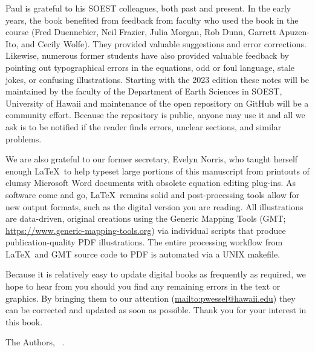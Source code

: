 Paul is grateful to his SOEST colleagues, both past and present. In the early years, the book benefited from
feedback from faculty who used the book in the course (Fred Duennebier, Neil Frazier, Julia Morgan, Rob Dunn, Garrett Apuzen-Ito, and Cecily Wolfe).  They provided valuable suggestions and error corrections.  Likewise, numerous former students have
also provided valuable feedback by pointing out typographical errors in the equations, odd or foul language,
stale jokes, or confusing illustrations.  Starting with the 2023 edition these notes will be maintained by the
faculty of the Department of Earth Sciences in SOEST, University of Hawaii and maintenance of the open
repository on GitHub will be a community effort.  Because the repository is public, anyone may use it and
all we ask is to be notified if the reader finds errors, unclear sections, and similar problems.

We are also grateful to our former secretary, Evelyn Norris,
who taught herself enough \LaTeX\ to help typeset large portions of this manuscript from printouts of clumsy Microsoft Word documents
with obsolete equation editing plug-ins.  As software come and go, \LaTeX\ remains solid and post-processing tools allow
for new output formats, such as the digital version you are reading.  All illustrations are data-driven, original creations using the
Generic Mapping Tools (GMT; \url{https://www.generic-mapping-tools.org}) via individual scripts that produce
publication-quality PDF illustrations.  The entire processing workflow from \LaTeX\ and GMT source code to PDF is automated via a UNIX makefile.

Because it is relatively easy to update digital books as frequently as required, we hope to hear from you should you find any remaining errors
in the text or graphics.  By bringing them to our attention (\url{mailto:pwessel@hawaii.edu})
they can be corrected and updated as soon as possible.  Thank you for your interest in this book.

\vspace{2\baselineskip}
The Authors, \DAmonth\ \DAyear.
